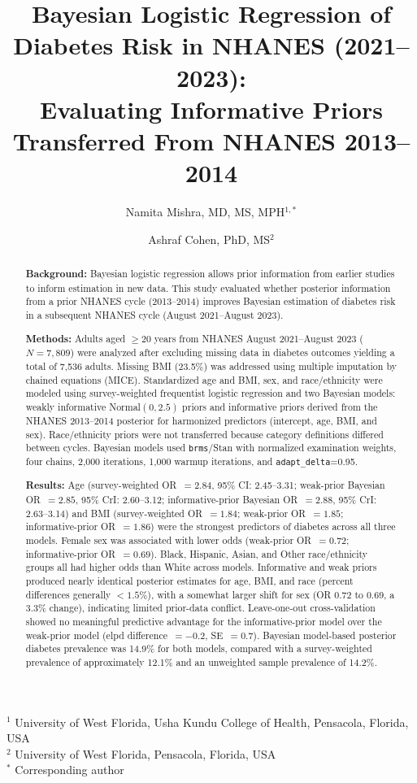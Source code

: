 \documentclass[11pt]{article}
\title{
\textbf{Bayesian Logistic Regression of Diabetes Risk in NHANES (2021--2023):\\
Evaluating Informative Priors Transferred From NHANES 2013--2014}
}
\author{
Namita Mishra, MD, MS, MPH$^{1,*}$ \and
Ashraf Cohen, PhD, MS$^{2}$
}
\date{}  %
\begin{document}
\maketitle

\noindent
$^{1}$ University of West Florida, Usha Kundu College of Health,
Pensacola, Florida, USA\\
$^{2}$ University of West Florida, Pensacola, Florida, USA\\
$^{*}$ Corresponding author


\begin{abstract}

\textbf{Background:} Bayesian logistic regression allows prior information
from earlier studies to inform estimation in new data. This study evaluated
whether posterior information from a prior NHANES cycle (2013--2014) improves
Bayesian estimation of diabetes risk in a subsequent NHANES cycle (August
2021--August 2023).

\textbf{Methods:} Adults aged $\geq20$ years from NHANES August
2021--August 2023 ($N=7{,}809$) were analyzed after excluding missing data in diabetes outcomes yielding a total of 7,536 adults. Missing BMI (23.5\%) was addressed using multiple imputation by chained equations
(MICE). Standardized age and BMI, sex, and race/ethnicity were modeled
using survey-weighted frequentist logistic regression and two Bayesian
models: weakly informative Normal$(0,2.5)$ priors and informative priors
derived from the NHANES 2013--2014 posterior for harmonized predictors
(intercept, age, BMI, and sex). Race/ethnicity priors were not transferred
because category definitions differed between cycles. Bayesian models used
\texttt{brms}/Stan with normalized examination weights, four chains,
2,000 iterations, 1,000 warmup iterations, and
\texttt{adapt\_delta}=0.95.

\textbf{Results:} Age (survey-weighted OR~$=2.84$, 95\% CI: 2.45--3.31;
weak-prior Bayesian OR~$=2.85$, 95\% CrI: 2.60--3.12; informative-prior
Bayesian OR~$=2.88$, 95\% CrI: 2.63--3.14) and BMI (survey-weighted
OR~$=1.84$; weak-prior OR~$=1.85$; informative-prior OR~$=1.86$) were the
strongest predictors of diabetes across all three models. Female sex was
associated with lower odds (weak-prior OR~$=0.72$; informative-prior
OR~$=0.69$). Black, Hispanic, Asian, and Other race/ethnicity groups all had
higher odds than White across models. Informative and weak
priors produced nearly identical posterior estimates for age, BMI, and race
(percent differences generally $<1.5\%$), with a somewhat larger shift for
sex (OR 0.72 to 0.69, a 3.3\% change), indicating limited prior-data
conflict. Leave-one-out cross-validation showed no meaningful predictive
advantage for the informative-prior model over the weak-prior model
(elpd difference~$=-0.2$, SE~$=0.7$). Bayesian model-based posterior diabetes
prevalence was 14.9\% for both models, compared with a survey-weighted
prevalence of approximately 12.1\% and an unweighted sample prevalence of
14.2\%.


\end{abstract}
\end{document}
